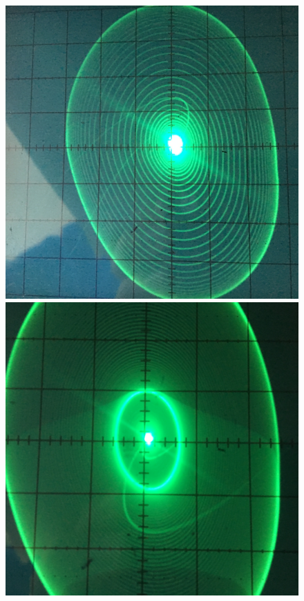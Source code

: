 \begin{figure}[h]
	\centering
	\begin{minipage}{0.32\linewidth}
	\includegraphics[width=\linewidth]{photo/task2c(mids).jpg}
	\end{minipage}
	\begin{minipage}{0.32\linewidth}
	\includegraphics[width=\linewidth]{photo/task2c(midm).jpg}

\end{minipage}
\end{figure}
